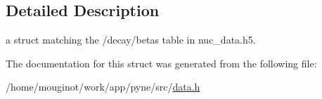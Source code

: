 \subsection{Detailed Description}
a struct matching the \textquotesingle{}/decay/betas\textquotesingle{} table in nuc\+\_\+data.\+h5. 

The documentation for this struct was generated from the following file\+:\begin{DoxyCompactItemize}
\item 
/home/mouginot/work/app/pyne/src/\hyperlink{data_8h}{data.\+h}\end{DoxyCompactItemize}
